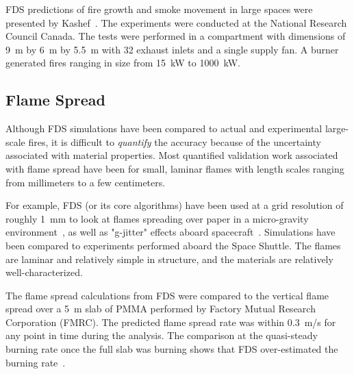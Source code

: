 FDS predictions of fire growth and smoke movement in large spaces were presented by  Kashef~\cite{Kashef:1}.  The experiments  were conducted at the
National Research Council  Canada.  The tests were performed in a compartment with  dimensions of 9~m by 6~m by  5.5~m with 32 exhaust inlets and a
single supply fan.  A burner  generated fires ranging in size  from 15~kW  to 1000~kW.


\subsection{Flame Spread}
\label{flame spread}

Although FDS simulations have been compared to actual and experimental large-scale fires, it is difficult to {\em quantify} the accuracy because of
the uncertainty associated with material properties. Most quantified validation work associated with flame spread have been for small, laminar flames with
length scales ranging from millimeters to a few centimeters.

For example, FDS (or its core algorithms) have been
used at a grid resolution of roughly 1~mm to look at flames spreading over paper in a micro-gravity
environment~\cite{McGrattan:C&F1996,Kashiwagi:CS1996,Mell:CS98,Mell:CS00,Prasad:CS2002,Nakamura:C&F2002},
as well as "g-jitter" effects aboard spacecraft~\cite{Mell:g-jitter}.
Simulations have been compared to experiments performed aboard the
Space Shuttle.  The flames are laminar and relatively simple in
structure, and the materials are relatively well-characterized.

The flame spread  calculations from FDS were compared  to the vertical flame  spread over  a 5~m  slab of  PMMA performed  by  Factory Mutual
Research  Corporation (FMRC).   The  predicted flame  spread rate  was within  0.3~m/s  for any  point  in  time  during the  analysis.   The
comparison at  the quasi-steady  burning rate once  the full  slab was burning     shows    that     FDS    over-estimated     the    burning
rate~\cite{Ma:2,Ma:3}.


